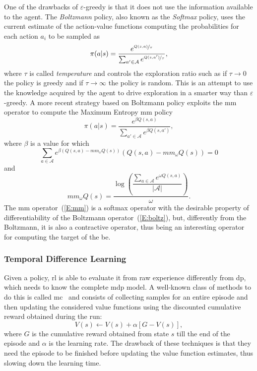 One of the drawbacks of $\varepsilon$-greedy is that it does not use the information available to the agent. The \textit{Boltzmann} policy, also known as the \textit{Softmax} policy, uses the current estimate of the action-value functions computing the probabilities for each action $a_i$ to be sampled as
\begin{equation}\label{E:boltz}
 \pi(a | s) = \dfrac{e^{\nicefrac{Q(s,a)}{\tau}}}{\sum_{a' \in \mathcal{A}}e^{\nicefrac{Q(s,a')}{\tau}}},
\end{equation}
where $\tau$ is called \textit{temperature} and controls the exploration ratio such as if $\tau \to 0$ the policy is greedy and if $\tau \to \infty$ the policy is random. This is an attempt to use the knowledge acquired by the agent to drive exploration in a smarter way than $\varepsilon$-greedy. A more recent strategy based on Boltzmann policy exploits the \gls{mm} operator to compute the Maximum Entropy \gls{mm} policy~\cite{asadi2016alternative}
\begin{equation}
 \pi(a | s) = \dfrac{e^{\beta Q(s,a)}}{\sum_{a' \in \mathcal{A}}e^{\beta Q(s,a')}},
\end{equation}
where $\beta$ is a value for which
\begin{equation}
 \sum_{a \in \mathcal{A}} e^{\beta(Q(s,a) - mm_\omega Q(s))}(Q(s,a)-mm_\omega Q(s))=0
\end{equation}
and
\begin{equation}\label{E:mm}
 mm_\omega Q(s) = \dfrac{\log(\dfrac{\sum_{a \in \mathcal{A}}e^{\omega Q(s,a)}}{|\mathcal{A}|})}{\omega}.
\end{equation}
The \gls{mm} operator~(\ref{E:mm}) is a softmax operator with the desirable property of differentiability of the Boltzmann operator~(\ref{E:boltz}), but, differently from the Boltzmann, it is also a contractive operator, thus being an interesting operator for computing the target of the \gls{be}. 

\subsubsection{Temporal Difference Learning}
Given a policy, \gls{rl} is able to evaluate it from raw experience differently from \gls{dp}, which needs to know the complete \gls{mdp} model. A well-known class of methods to do this is called \gls{mc}~\cite{robert2013monte} and consists of collecting samples for an entire episode and then updating the considered value functions using the discounted cumulative reward obtained during the run:
\begin{equation}\label{E:mc}
 V(s) \gets V(s) + \alpha [G - V(s)],
\end{equation}
where $G$ is the cumulative reward obtained from state $s$ till the end of the episode and $\alpha$ is the learning rate.
The drawback of these techniques is that they need the episode to be finished before updating the value function estimates, thus slowing down the learning time.

